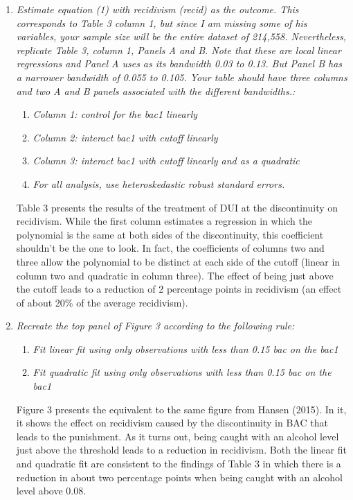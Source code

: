\documentclass[11pt, letterpaper]{article}
\newcommand*{\commonpath}{C:/Users/Nicolás Urdaneta/Documents/GitHub/RDD}
\begin{document}
\begin{enumerate}
	\item \textit{Estimate equation (1) with recidivism (recid) as the outcome.  This corresponds to Table 3 column 1, but since I am missing some of his variables, your sample size will be the entire dataset of 214,558.  Nevertheless, replicate Table 3, column 1, Panels A and B.  Note that these are local linear regressions and Panel A uses as its bandwidth 0.03 to 0.13.  But Panel B has a narrower bandwidth of 0.055 to 0.105.  Your table should have three columns and two A and B panels associated with the different bandwidths.:}
	\begin{enumerate}[label=(\alph*)]
		\item \textit{Column 1: control for the bac1 linearly}
		\item \textit{Column 2: interact bac1 with cutoff linearly}
		\item \textit{Column 3: interact bac1 with cutoff linearly and as a quadratic}
		\item \textit{For all analysis, use heteroskedastic robust standard errors.}
	\end{enumerate}

	Table 3 presents the results of the treatment of DUI at the discontinuity on recidivism. While the first column estimates a regression in which the polynomial is the same at both sides of the discontinuity, this coefficient shouldn't be the one to look. In fact, the coefficients of columns two and three allow the polynomial to be distinct at each side of the cutoff (linear in column two and quadratic in column three). The effect of being just above the cutoff leads to a reduction of 2 percentage points in recidivism (an effect of about 20\% of the average recidivism).  \\

	
	

	\item \textit{Recreate the top panel of Figure 3 according to the following rule: }
	\begin{enumerate}[label=(\alph*)]
		\item \textit{Fit linear fit using only observations with less than 0.15 bac on the bac1}
		\item \textit{Fit quadratic fit using only observations with less than 0.15 bac on the bac1}
	\end{enumerate}

	Figure 3 presents the equivalent to the same figure from Hansen (2015). In it, it shows the effect on recidivism caused by the discontinuity in BAC that leads to the punishment. As it turns out, being caught with an alcohol level just above the threshold leads to a reduction in recidivism. Both the linear fit and quadratic fit are consistent to the findings of Table 3 in which there is a reduction in about two percentage points when being caught with an alcohol level above 0.08. \\


\end{enumerate}
\end{document}
